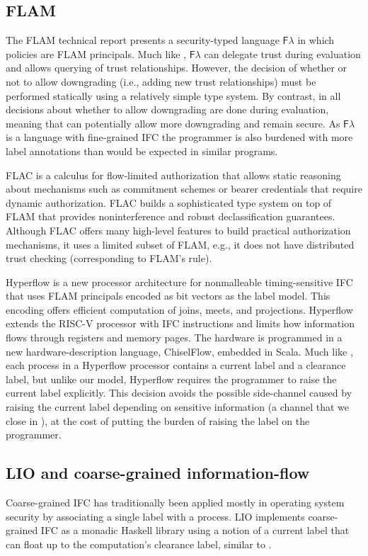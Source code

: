 \subsection{FLAM}
The FLAM technical report \cite{flamtr} presents a security-typed language $\mathsf{F}\lambda$ in which policies are FLAM principals. Much like \lang{}, $\mathsf{F}\lambda$ can delegate trust during evaluation and allows querying of trust relationships. However, the decision of whether or not to allow downgrading (i.e., adding new trust relationships) must be performed statically using a relatively simple type system. By contrast, in \lang{} all decisions about whether to allow downgrading are done during evaluation, meaning that \lang{} can potentially allow more downgrading and remain secure. As $\mathsf{F}\lambda$ is a language with fine-grained IFC the programmer is also burdened with more label annotations than would be expected in  similar \lang{} programs.

FLAC \cite{7536372} is a calculus for flow-limited authorization that allows static reasoning about mechanisms such as commitment schemes or bearer credentials that require dynamic authorization. FLAC builds a sophisticated type system on top of FLAM that provides noninterference and robust declassification guarantees. Although FLAC offers many high-level features to build practical authorization mechanisms, it uses a limited subset of FLAM, e.g., it does not have distributed trust checking (corresponding to FLAM's  rule).

Hyperflow \cite{hyperflow} is a new processor architecture for nonmalleable timing-sensitive IFC that uses FLAM principals encoded as bit vectors as the label model. This encoding offers efficient computation of joins, meets, and projections. Hyperflow extends the RISC-V processor with IFC instructions and limits how information flows through registers and memory pages. The hardware is programmed in a new hardware-description language, ChiselFlow, embedded in Scala. Much like \lang{}, each process in a Hyperflow processor contains a current label and a clearance label, but unlike our model, Hyperflow requires the programmer to raise the current label explicitly. This decision avoids the possible side-channel caused by raising the current label depending on sensitive information (a channel that we close in \lang), at the cost of putting the burden of raising the label on the programmer.

\subsection{LIO and coarse-grained information-flow}
Coarse-grained IFC has traditionally been applied mostly in operating system security \cite{Zeldovich:2006:MIF:1267308.1267327, Krohn:2007:IFC:1294261.1294293} by associating a single label with a process. LIO \cite{SRMMlio} implements coarse-grained IFC as a monadic Haskell library using a notion of a current label that can float up to the computation's clearance label, similar to \lang.

